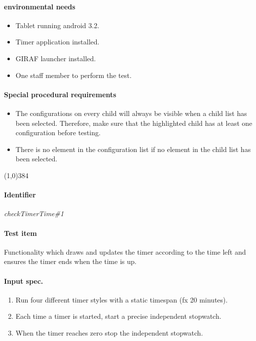 \paragraph{environmental needs}
	\begin{itemize}
		\item Tablet running android 3.2.
		\item Timer application installed.
		\item GIRAF launcher installed.
		\item One staff member to perform the test.
	\end{itemize}
\paragraph{Special procedural requirements}
	\begin{itemize}
		\item The configurations on every child will always be visible when a child list has been selected. Therefore, make sure that the highlighted child has at least one configuration before testing.
		\item There is no element in the configuration list if no element in the child list has been selected.
	\end{itemize}
\begin{center}
	\line(1,0){384}
\end{center}

\paragraph{Identifier}
	\textit{checkTimerTime\#1}
\paragraph{Test item}
	Functionality which draws and updates the timer according to the time left and ensures the timer ends when the time is up.
\paragraph{Input spec.}
	\begin{enumerate}
		\item Run four different timer styles with a static timespan (fx 20 minutes).
		\item Each time a timer is started, start a precise independent stopwatch.
		\item When the timer reaches zero stop the independent stopwatch.
	\end{enumerate}
